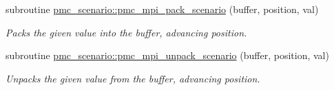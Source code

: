 \begin{DoxyCompactItemize}
subroutine \mbox{\hyperlink{namespacepmc__scenario_a93772962c3e78b32063cb735d357878a}{pmc\+\_\+scenario\+::pmc\+\_\+mpi\+\_\+pack\+\_\+scenario}} (buffer, position, val)
\begin{DoxyCompactList}\small\item\em Packs the given value into the buffer, advancing position. \end{DoxyCompactList}\item 
subroutine \mbox{\hyperlink{namespacepmc__scenario_afddd83d6cfc65b32e3cce01d70ecdf85}{pmc\+\_\+scenario\+::pmc\+\_\+mpi\+\_\+unpack\+\_\+scenario}} (buffer, position, val)
\begin{DoxyCompactList}\small\item\em Unpacks the given value from the buffer, advancing position. \end{DoxyCompactList}\end{DoxyCompactItemize}
